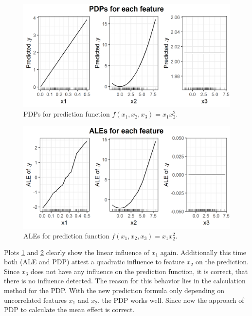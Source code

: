 \documentclass[
]{krantz}
\begin{document}
\begin{figure}
\includegraphics[width=1\linewidth]{images/ale_1_PDPs_x1x22_150_0_0p5_2_2} \caption{PDPs for prediction function \(f(x_1, x_2, x_3) = x_1 x_2^2\).}\label{fig:pdpsx1x22}
\end{figure}



\begin{figure}
\includegraphics[width=1\linewidth]{images/ale_1_ALEs_x1x22_150_0_0p5_2_2} \caption{ALEs for prediction function \(f(x_1, x_2, x_3) = x_1 x_2^2\).}\label{fig:alesx1x22}
\end{figure}



Plots \ref{fig:pdpsx1x22} and \ref{fig:alesx1x22} clearly show the linear influence of \(x_1\) again. Additionally this time both (ALE and PDP) attest a quadratic influence to feature \(x_2\) on the prediction. Since \(x_3\) does not have any influence on the prediction function, it is correct, that there is no influence detected.
The reason for this behavior lies in the calculation method for the PDP. With the new prediction formula only depending on uncorrelated features \(x_1\) and \(x_2\), the PDP works well. Since now the approach of PDP to calculate the mean effect is correct.
\end{document}
